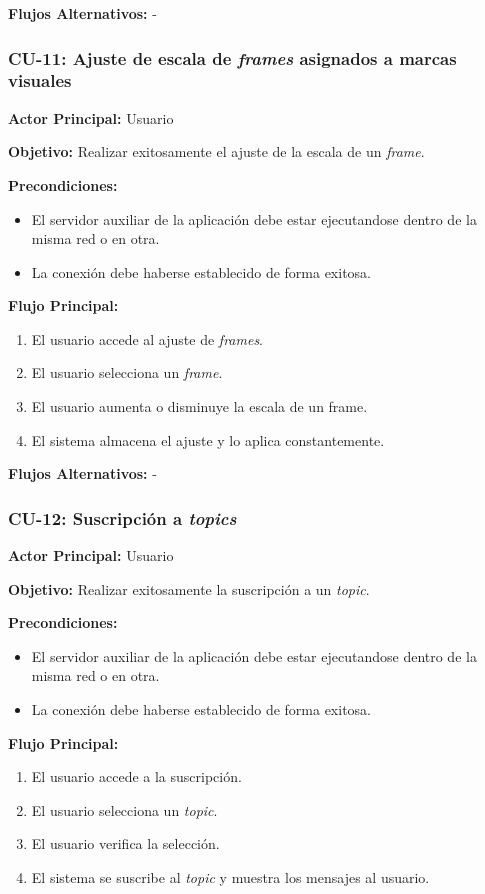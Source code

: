 \textbf{Flujos Alternativos:}
-

\subsubsection{CU-11: Ajuste de escala de \textit{frames} asignados a marcas visuales}

\textbf{Actor Principal:} Usuario

\textbf{Objetivo:}
Realizar exitosamente el ajuste de la escala de un \textit{frame}.

\textbf{Precondiciones:}
\begin{itemize}
    \item El servidor auxiliar de la aplicación debe estar ejecutandose dentro de la misma red o en otra. 
    \item La conexión debe haberse establecido de forma exitosa.
\end{itemize}

\textbf{Flujo Principal:}
\begin{enumerate}
    \item El usuario accede al ajuste de \textit{frames}.  
    \item El usuario selecciona un \textit{frame}.
    \item El usuario aumenta o disminuye la escala de un frame.
    \item El sistema almacena el ajuste y lo aplica constantemente.
\end{enumerate}

\textbf{Flujos Alternativos:}
-

\subsubsection{CU-12: Suscripción a \textit{topics}}

\textbf{Actor Principal:} Usuario

\textbf{Objetivo:}
Realizar exitosamente la suscripción a un \textit{topic}.

\textbf{Precondiciones:}
\begin{itemize}
    \item El servidor auxiliar de la aplicación debe estar ejecutandose dentro de la misma red o en otra. 
    \item La conexión debe haberse establecido de forma exitosa.
\end{itemize}

\textbf{Flujo Principal:}
\begin{enumerate}
    \item El usuario accede a la suscripción.  
    \item El usuario selecciona un \textit{topic}.
    \item El usuario verifica la selección.
    \item El sistema se suscribe al \textit{topic} y muestra los mensajes al usuario.
\end{enumerate}

